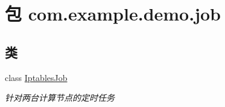 \hypertarget{namespacecom_1_1example_1_1demo_1_1job}{}\section{包 com.\+example.\+demo.\+job}
\label{namespacecom_1_1example_1_1demo_1_1job}
\subsection*{类}
\begin{DoxyCompactItemize}
\item 
class \mbox{\hyperlink{classcom_1_1example_1_1demo_1_1job_1_1_iptables_job}{Iptables\+Job}}
\begin{DoxyCompactList}\small\item\em 针对两台计算节点的定时任务 \end{DoxyCompactList}\end{DoxyCompactItemize}
